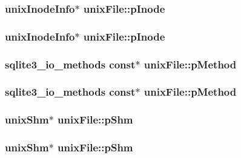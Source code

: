 \subsubsection{\setlength{\rightskip}{0pt plus 5cm}\bf{unix\-Inode\-Info}$\ast$ \bf{unix\-File::p\-Inode}}\label{structunixFile_cd561c678eba04a430ea4f8ddf860907}


\subsubsection{\setlength{\rightskip}{0pt plus 5cm}\bf{unix\-Inode\-Info}$\ast$ \bf{unix\-File::p\-Inode}}\label{structunixFile_cd561c678eba04a430ea4f8ddf860907}


\subsubsection{\setlength{\rightskip}{0pt plus 5cm}\bf{sqlite3\_\-io\_\-methods} const$\ast$ \bf{unix\-File::p\-Method}}\label{structunixFile_6496bfb3532527d9f7b426825aa29e51}


\subsubsection{\setlength{\rightskip}{0pt plus 5cm}\bf{sqlite3\_\-io\_\-methods} const$\ast$ \bf{unix\-File::p\-Method}}\label{structunixFile_6496bfb3532527d9f7b426825aa29e51}


\subsubsection{\setlength{\rightskip}{0pt plus 5cm}\bf{unix\-Shm}$\ast$ \bf{unix\-File::p\-Shm}}\label{structunixFile_544786e77a9e1d040c9c9badee361c87}


\subsubsection{\setlength{\rightskip}{0pt plus 5cm}\bf{unix\-Shm}$\ast$ \bf{unix\-File::p\-Shm}}\label{structunixFile_544786e77a9e1d040c9c9badee361c87}


